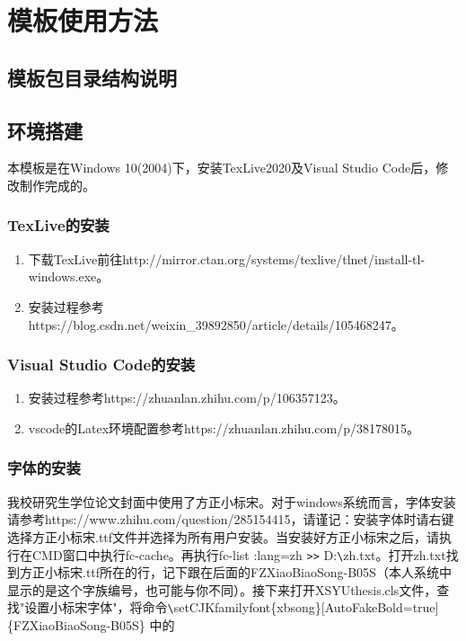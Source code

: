 \chapter{模板使用方法}
\section{模板包目录结构说明}
\section{环境搭建}
本模板是在Windows 10(2004)下，安装TexLive2020及Visual Studio Code后，修改制作完成的。
\subsection{TexLive的安装}
\begin{enumerate}
    \item 下载TexLive前往http://mirror.ctan.org/systems/texlive/tlnet/install-tl-windows.exe。
    \item 安装过程参考https://blog.csdn.net/weixin\_39892850/article/details/105468247。
\end{enumerate}
\subsection{Visual Studio Code的安装}
\begin{enumerate}
    \item 安装过程参考https://zhuanlan.zhihu.com/p/106357123。
    \item vscode的Latex环境配置参考https://zhuanlan.zhihu.com/p/38178015。
\end{enumerate}
\subsection{字体的安装}
我校研究生学位论文封面中使用了方正小标宋。对于windows系统而言，字体安装请参考https://www.zhihu.com/question/285154415，请谨记：安装字体时请右键选择方正小标宋.ttf文件并选择为所有用户安装。当安装好方正小标宋之后，请执行在CMD窗口中执行fc-cache。再执行fc-list :lang=zh \verb|>>| D:\verb|\|zh.txt。打开zh.txt找到方正小标宋.ttf所在的行，记下跟在后面的FZXiaoBiaoSong-B05S（本人系统中显示的是这个字族编号，也可能与你不同）。接下来打开XSYUthesis.cls文件，查找"设置小标宋字体"，将命令\verb|\|setCJKfamilyfont\{xbsong\}[AutoFakeBold=true]\{FZXiaoBiaoSong-B05S\} 中的

